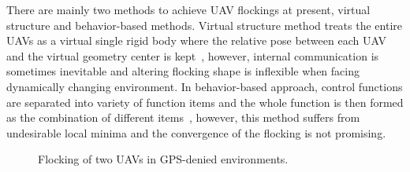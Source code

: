 There are mainly two methods to achieve UAV flockings at present, virtual structure and behavior-based methods. Virtual structure method treats the entire UAVs as a virtual single rigid body where the relative pose between each UAV and the virtual geometry center is kept~\cite{Virtual2008,Askari2015,Cai2012,RAS,Distributed,LQR2014,VirtualLeader}, however, internal communication is sometimes inevitable and altering flocking shape is inflexible when facing dynamically changing environment. In behavior-based approach, control functions are separated into variety of function items and the whole function is then formed as the combination of different items~\cite{Zhang2018,Martin2014,Vicsek2018,VLAP,Behavior2004}, however, this method suffers from undesirable local minima and the convergence of the flocking is not promising.

\begin{figure}[htb]
  \centering
  \caption{Flocking of two UAVs in GPS-denied environments.}\label{fig:indoor_outdoor}
\end{figure}

